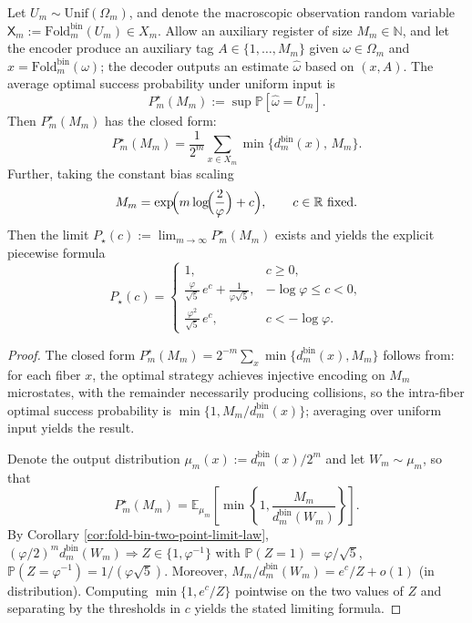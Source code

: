 \begin{theorem}\label{thm:xi-optimal-reconstruction-success-probability-constant-bias}
Let \(U_m\sim\mathrm{Unif}(\Omega_m)\), and denote the macroscopic observation random variable
\(
\mathsf{X}_m:=\mathrm{Fold}^{\mathrm{bin}}_m(U_m)\in X_m
\).
Allow an auxiliary register of size \(M_m\in\mathbb N\), and let the encoder produce an auxiliary tag \(A\in\{1,\dots,M_m\}\) given \(\omega\in\Omega_m\) and \(x=\mathrm{Fold}^{\mathrm{bin}}_m(\omega)\); the decoder outputs an estimate \(\widehat\omega\) based on \((x,A)\).
The average optimal success probability under uniform input is
\[
P_m^\star(M_m):=\sup \mathbb P[\widehat\omega=U_m].
\]
Then \(P_m^\star(M_m)\) has the closed form:
\[
P_m^\star(M_m)=\frac{1}{2^m}\sum_{x\in X_m}\min\!\bigl\{d_m^{\mathrm{bin}}(x),\,M_m\bigr\}.
\]
Further, taking the constant bias scaling
\[
M_m=\exp\!\Bigl(m\log\!\Bigl(\frac{2}{\varphi}\Bigr)+c\Bigr),
\qquad c\in\mathbb R\ \text{fixed}.
\]
Then the limit
\(
P_\star(c):=\lim_{m\to\infty}P_m^\star(M_m)
\)
exists and yields the explicit piecewise formula
\[
P_\star(c)=
\begin{cases}
1, & c\ge 0,\\[6pt]
\displaystyle \frac{\varphi}{\sqrt5}\,e^{c}+\frac{1}{\varphi\sqrt5}, & -\log\varphi\le c<0,\\[10pt]
\displaystyle \frac{\varphi^2}{\sqrt5}\,e^{c}, & c<-\log\varphi.
\end{cases}
\]
\end{theorem}

\begin{proof}
The closed form \(P_m^\star(M_m)=2^{-m}\sum_x\min\{d_m^{\mathrm{bin}}(x),M_m\}\) follows from: for each fiber \(x\), the optimal strategy achieves injective encoding on \(M_m\) microstates, with the remainder necessarily producing collisions, so the intra-fiber optimal success probability is \(\min\{1,M_m/d_m^{\mathrm{bin}}(x)\}\); averaging over uniform input yields the result.
\par
Denote the output distribution \(\mu_m(x):=d_m^{\mathrm{bin}}(x)/2^m\) and let \(W_m\sim\mu_m\), so that
\[
P_m^\star(M_m)=\mathbb E_{\mu_m}\!\left[\min\!\left\{1,\frac{M_m}{d_m^{\mathrm{bin}}(W_m)}\right\}\right].
\]
By Corollary \ref{cor:fold-bin-two-point-limit-law},
\(
(\varphi/2)^m d_m^{\mathrm{bin}}(W_m)\Rightarrow Z\in\{1,\varphi^{-1}\}
\)
with
\(
\mathbb P(Z=1)=\varphi/\sqrt5
\),
\(
\mathbb P(Z=\varphi^{-1})=1/(\varphi\sqrt5)
\).
Moreover, \(M_m/d_m^{\mathrm{bin}}(W_m)=e^{c}/Z+o(1)\) (in distribution). Computing \(\min\{1,e^{c}/Z\}\) pointwise on the two values of \(Z\) and separating by the thresholds in \(c\) yields the stated limiting formula.
\end{proof}

